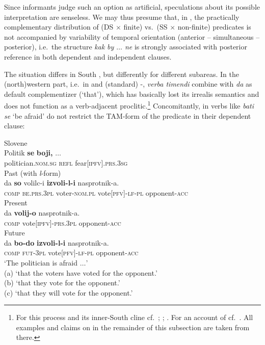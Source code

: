 \documentclass[output=paper,colorlinks,citecolor=brown]{langscibook}
\begin{document}
\noindent Since informants judge such an option as artificial, speculations about its possible interpretation are senseless. We may thus presume that, in , the practically complementary distribution of (DS ${\times}$ finite) vs.\ (SS ${\times}$ non-finite) predicates is not accompanied by variability of temporal orientation (anterior -- simultaneous -- posterior), i.e.\ the structure \textit{kak} \textit{by $\ldots$ ne} is strongly associated with posterior reference in both dependent and independent clauses.


The situation differs in South , but differently for different subareas. In the (north)western part, i.e.\ in  and (standard) -, \textit{verba timendi} combine with \textit{da} as default complementizer (`that'), which has basically lost its irrealis semantics and does not function as a verb-adjacent proclitic.\footnote{For this process and its inner-South  cline cf.\ \citet{Sedláček1970}; \citet{Grković-Major2004}; \citet{Grković-Major2020}. For an account of  cf.\ \citet[98--103]{Žele2017}. All examples and claims on  in the remainder of this subsection are taken from there.} Concomitantly, in  verbs like \textit{bati se} `be afraid' do not restrict the TAM-form of the predicate in their dependent clause:


\ea
\label{ex:wiemer27} \textnormal{Slovene} \\
\gll Politik \textbf{se} \textbf{boji,} $\ldots$ \\
politician\textsc{.nom.sg} \textsc{refl} fear\textsc{[ipfv].prs.3sg} \\
\ea \label{ex:wiemer27a} \textnormal{Past (with \textit{l}-form)} \\
\gll da \textbf{so} volilc-i \textbf{izvoli-l-i} nasprotnik-a. \\
\textsc{comp} \textsc{be.prs.3pl} voter-\textsc{nom.pl} vote\textsc{[pfv]-lf-pl} opponent-\textsc{acc} \\
\ex \label{ex:wiemer27b} \textnormal{Present} \\
\gll da \textbf{volij-o} nasprotnik-a. \\
\textsc{comp} vote\textsc{[ipfv]-prs.3pl} opponent-\textsc{acc} \\
\ex \label{ex:wiemer27c} \textnormal{Future} \\
\gll da \textbf{bo-do} \textbf{izvoli-l-i} nasprotnik-a. \\
\textsc{comp} \textsc{fut-3pl} vote\textsc{[pfv]-lf-pl} opponent-\textsc{acc} \\
\glt `The politician is afraid $\ldots$' \\
(a) `that the voters have voted for the opponent.' \\
(b) `that they vote for the opponent.' \\
(c)	`that they will vote for the opponent.'
\z
\z
\end{document}
